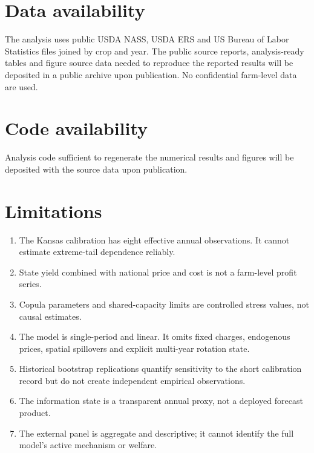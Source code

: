 \documentclass[11pt]{article}
\begin{document}
\section{Data availability}

The analysis uses public USDA NASS, USDA ERS and US Bureau of Labor Statistics
files joined by crop and year. The public source reports, analysis-ready
tables and figure source data needed to reproduce the reported results will be
deposited in a public archive upon publication. No confidential
farm-level data are used.

\section{Code availability}

Analysis code sufficient to regenerate the numerical results and figures will
be deposited with the source data upon publication.

\section{Limitations}

\begin{enumerate}
\item The Kansas calibration has eight effective annual observations. It
cannot estimate extreme-tail dependence reliably.
\item State yield combined with national price and cost is not a farm-level
profit series.
\item Copula parameters and shared-capacity limits are controlled stress
values, not causal estimates.
\item The model is single-period and linear. It omits fixed charges,
endogenous prices, spatial spillovers and explicit multi-year rotation state.
\item Historical bootstrap replications quantify sensitivity to the short
calibration record but do not create independent empirical observations.
\item The information state is a transparent annual proxy, not a deployed
forecast product.
\item The external panel is aggregate and descriptive; it cannot identify the
full model's active mechanism or welfare.
\end{enumerate}
\end{document}
